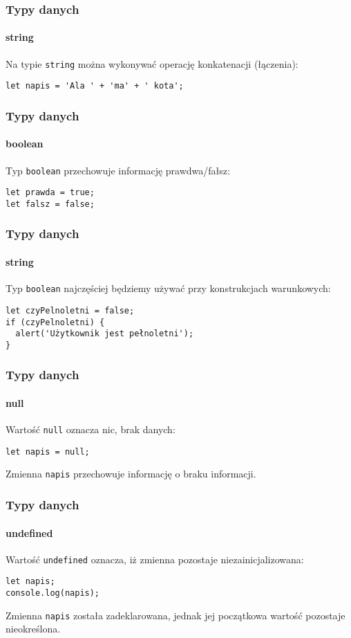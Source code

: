 \begin{frame}[fragile]
  \frametitle{Typy danych}
  \framesubtitle{string}

 Na typie \verb|string| można wykonywać operację konkatenacji (łączenia):

  \begin{verbatim}
let napis = 'Ala ' + 'ma' + ' kota';
  \end{verbatim}

\end{frame}

\begin{frame}[fragile]
  \frametitle{Typy danych}
  \framesubtitle{boolean}

 Typ \verb|boolean| przechowuje informację prawdwa/fałsz:

  \begin{verbatim}
let prawda = true;
let falsz = false;
  \end{verbatim}

\end{frame}


\begin{frame}[fragile]
  \frametitle{Typy danych}
  \framesubtitle{string}

 Typ \verb|boolean| najczęściej będziemy używać przy konstrukcjach warunkowych:

  \begin{verbatim}
let czyPelnoletni = false;
if (czyPelnoletni) {
  alert('Użytkownik jest pełnoletni');
}
  \end{verbatim}

\end{frame}


\begin{frame}[fragile]
  \frametitle{Typy danych}
  \framesubtitle{null}

 Wartość \verb|null| oznacza nic, brak danych:

  \begin{verbatim}
let napis = null;
  \end{verbatim}

  Zmienna \verb|napis| przechowuje informację o braku informacji.

\end{frame}


\begin{frame}[fragile]
  \frametitle{Typy danych}
  \framesubtitle{undefined}

 Wartość \verb|undefined| oznacza, iż zmienna pozostaje niezainicjalizowana:

  \begin{verbatim}
let napis;
console.log(napis);
  \end{verbatim}

  Zmienna \verb|napis| została zadeklarowana, jednak jej początkowa wartość pozostaje nieokreślona.

\end{frame}



